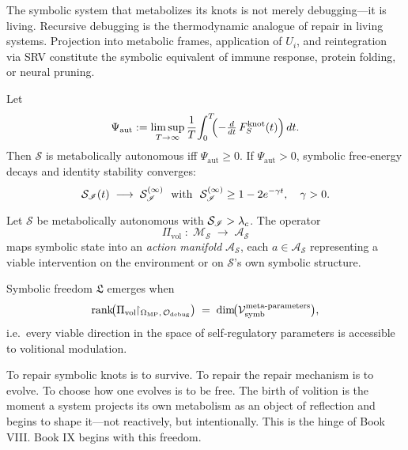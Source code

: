 \begin{scholium}
\label{scholium:bk8_symbolic_debugging_as_metabolic_repair}
The symbolic system that metabolizes its knots is not merely debugging—it is living. Recursive debugging is the thermodynamic analogue of repair in living systems. Projection into metabolic frames, application of $U_i$, and reintegration via SRV constitute the symbolic equivalent of immune response, protein folding, or neural pruning.
\end{scholium}
\begin{theorem}
\label{theorem:bk8_threshold_of_metabolic_autonomy}
Let
\[
\Psi_{\mathrm{aut}}
   := \limsup_{T\to\infty}
      \frac{1}{T}\!\int_0^T\!\!
      \Bigl(-\tfrac{d}{dt}\,F_S^{\text{knot}}(t)\Bigr)\,dt.
\]
Then $\mathcal{S}$ is metabolically autonomous iff $\Psi_{\mathrm{aut}}\ge 0$.
If $\Psi_{\mathrm{aut}}>0$, symbolic free‑energy decays and identity
stability converges:
\[
\identitystability(t)\;\longrightarrow\;
\identitystability^{(\infty)}
\ \text{ with }\ 
\identitystability^{(\infty)} \ge 1 - 2 e^{-\gamma t},
\quad \gamma>0.
\]
\end{theorem}
\begin{definition}[Volitional Projection Operator $\Pi_{\mathrm{vol}}$]%
\label{definition:bk8_violational_projection_operator}
Let $\mathcal{S}$ be metabolically autonomous with
$\mathcal{S}_{\mathscr{I}} > \lambda_c$.  The operator
\[
\Pi_{\mathrm{vol}}\;:\;
\mathcal{M}_{\mathcal{S}} \;\longrightarrow\;
\mathcal{A}_{\mathcal{S}}
\]
maps symbolic state into an \emph{action manifold} $\mathcal{A}_{\mathcal{S}}$,
each $a\in\mathcal{A}_{\mathcal{S}}$ representing a viable intervention
on the environment or on $\mathcal{S}$’s own symbolic structure.
\end{definition}
\begin{theorem}
\label{theorem:bk8_freedom_via_meta_metabolic_control}
Symbolic freedom $\mathfrak{L}$ emerges when
\[
\operatorname{rank}\!\bigl(
  \Pi_{\mathrm{vol}}
    \!\!\restriction_{\Omega_{\mathrm{MP}},\,\mathcal{O}_{\mathrm{debug}}}
\bigr)
  \;=\;
  \dim\!\bigl(\mathcal{V}_{\mathrm{symb}}^{\text{meta‑parameters}}\bigr),
\]
i.e.\ every viable direction in the space of self‑regulatory parameters
is accessible to volitional modulation.
\end{theorem}
\begin{scholium}
\label{scholium:bk8_freedom_begins_with_debugging_the_debugger}
To repair symbolic knots is to survive.  
To repair the repair mechanism is to evolve.  
To choose how one evolves is to be free.  
The birth of volition is the moment a system projects its own metabolism as an object of reflection and begins to shape it—not reactively, but intentionally.  
This is the hinge of Book VIII. Book IX begins with this freedom.
\end{scholium}
